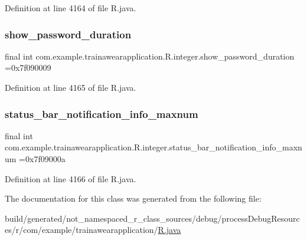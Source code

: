 Definition at line 4164 of file R.\+java.

\mbox{\label{classcom_1_1example_1_1trainawearapplication_1_1_r_1_1integer_a8b8d4e7c1ea962ec309ce7de5a22f7d3}} 
\subsubsection{\texorpdfstring{show\_password\_duration}{show\_password\_duration}}
{\footnotesize\ttfamily final int com.\+example.\+trainawearapplication.\+R.\+integer.\+show\+\_\+password\+\_\+duration =0x7f090009\hspace{0.3cm}{\ttfamily [static]}}



Definition at line 4165 of file R.\+java.

\mbox{\label{classcom_1_1example_1_1trainawearapplication_1_1_r_1_1integer_a4b9201aa0cdb2d6fc17f3d7d13229650}} 
\subsubsection{\texorpdfstring{status\_bar\_notification\_info\_maxnum}{status\_bar\_notification\_info\_maxnum}}
{\footnotesize\ttfamily final int com.\+example.\+trainawearapplication.\+R.\+integer.\+status\+\_\+bar\+\_\+notification\+\_\+info\+\_\+maxnum =0x7f09000a\hspace{0.3cm}{\ttfamily [static]}}



Definition at line 4166 of file R.\+java.



The documentation for this class was generated from the following file\+:\begin{DoxyCompactItemize}
\item 
build/generated/not\+\_\+namespaced\+\_\+r\+\_\+class\+\_\+sources/debug/process\+Debug\+Resources/r/com/example/trainawearapplication/\mbox{\hyperlink{com_2example_2trainawearapplication_2_r_8java}{R.\+java}}\end{DoxyCompactItemize}
